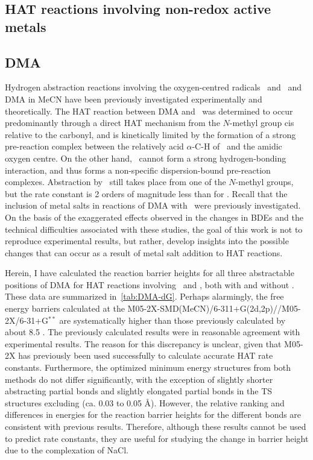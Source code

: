 \begin{doublespace}
\section{HAT reactions involving non-redox active metals}

\subsection{DMA}

Hydrogen abstraction reactions involving the oxygen-centred radicals \bno\ and
\cumo\ and DMA in MeCN have been previously investigated experimentally and
theoretically.\cite{Salamone2013} The HAT reaction between DMA and \bno\ was
determined to occur predominantly through a direct HAT mechanism from the
$N$-methyl group cis relative to the carbonyl, and is kinetically limited by the
formation of a strong pre-reaction complex between the relatively acid
$\alpha$-C-H of \bno\ and the amidic oxygen centre. On the other hand, \cumo\
cannot form a strong hydrogen-bonding interaction, and thus forms a
non-specific dispersion-bound pre-reaction complexes. Abstraction by \cumo\
still takes place from one of the $N$-methyl groups, but the rate constant is 2
orders of magnitude less than for \bno. Recall that the inclusion of metal salts
in reactions of DMA with \cumo\ were previously
investigated.\cite{Salamone2015metals} On the basis of the exaggerated effects
observed in the changes in BDEs and the technical difficulties associated with
these studies, the goal of this work is not to reproduce experimental results,
but rather, develop insights into the possible changes that can occur as a
result of metal salt addition to HAT reactions.

Herein, I have calculated the reaction barrier heights for all three
abstractable positions of DMA for HAT reactions involving \cumo\ and \bno, both
with and without \ch{NaCl}. These data are summarized in~\ref{tab:DMA-dG}.
Perhaps alarmingly, the free energy barriers calculated at the
M05-2X-SMD(MeCN)/6-311+G(2d,2p)//M05-2X/6-31+G$^{**}$ are systematically higher
than those previously calculated by about 8.5 \kcalmol.\cite{Salamone2013} The
previously calculated results were in reasonable agreement with experimental
results. The reason for this discrepancy is unclear, given that M05-2X has
previously been used successfully to calculate accurate HAT rate
constants.\cite{Galano2013} Furthermore, the optimized minimum energy structures
from both methods do not differ significantly, with the exception of slightly
shorter abstracting \ch{C-H} partial bonds and slightly elongated \ch{O-H}
partial bonds in the TS structures excluding \ch{NaCl} (ca. 0.03 to 0.05 \AA).
However, the relative ranking and differences in energies for the reaction
barrier heights for the different \ch{C-H} bonds are consistent with previous
results. Therefore, although these results cannot be used to predict rate
constants, they are useful for studying the change in barrier height due to the
complexation of NaCl.


\end{doublespace}
